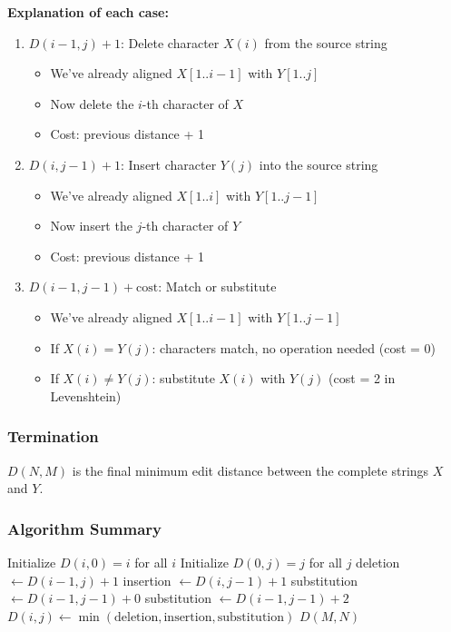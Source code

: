 \documentclass[11pt,a4paper]{article}
\theoremstyle{definition}
\theoremstyle{plain}
\theoremstyle{remark}
\begin{document}
\textbf{Explanation of each case:}

\begin{enumerate}
    \item \textbf{$D(i-1,j) + 1$}: Delete character $X(i)$ from the source string
    \begin{itemize}
        \item We've already aligned $X[1..i-1]$ with $Y[1..j]$
        \item Now delete the $i$-th character of $X$
        \item Cost: previous distance + 1
    \end{itemize}
    
    \item \textbf{$D(i,j-1) + 1$}: Insert character $Y(j)$ into the source string
    \begin{itemize}
        \item We've already aligned $X[1..i]$ with $Y[1..j-1]$
        \item Now insert the $j$-th character of $Y$
        \item Cost: previous distance + 1
    \end{itemize}
    
    \item \textbf{$D(i-1,j-1) + \text{cost}$}: Match or substitute
    \begin{itemize}
        \item We've already aligned $X[1..i-1]$ with $Y[1..j-1]$
        \item If $X(i) = Y(j)$: characters match, no operation needed (cost = 0)
        \item If $X(i) \neq Y(j)$: substitute $X(i)$ with $Y(j)$ (cost = 2 in Levenshtein)
    \end{itemize}
\end{enumerate}

\subsubsection{Termination}

$D(N,M)$ is the final minimum edit distance between the complete strings $X$ and $Y$.

\subsubsection{Algorithm Summary}

\begin{algorithm}
\caption{Minimum Edit Distance (Levenshtein)}
\begin{algorithmic}
\STATE Initialize $D(i,0) = i$ for all $i$
\STATE Initialize $D(0,j) = j$ for all $j$
        \STATE deletion $\leftarrow D(i-1,j) + 1$
        \STATE insertion $\leftarrow D(i,j-1) + 1$
            \STATE substitution $\leftarrow D(i-1,j-1) + 0$
        \ELSE
            \STATE substitution $\leftarrow D(i-1,j-1) + 2$
        \ENDIF
        \STATE $D(i,j) \leftarrow \min(\text{deletion}, \text{insertion}, \text{substitution})$
    \ENDFOR
\ENDFOR
\RETURN $D(M,N)$
\end{algorithmic}
\end{algorithm}
\end{document}
